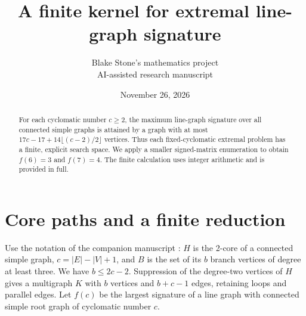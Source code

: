 \documentclass[11pt]{article}
\title{A finite kernel for extremal line-graph signature}
\author{Blake Stone's mathematics project\\\small AI-assisted research manuscript}
\date{November 26, 2026}
\begin{document}
\maketitle
\begin{abstract}
For each cyclomatic number $c\ge2$, the maximum line-graph signature over all connected simple graphs is attained by a graph with at most $17c-17+14\lfloor(c-2)/2\rfloor$ vertices. Thus each fixed-cyclomatic extremal problem has a finite, explicit search space. We apply a smaller signed-matrix enumeration to obtain $f(6)=3$ and $f(7)=4$. The finite calculation uses integer arithmetic and is provided in full.
\end{abstract}

\section{Core paths and a finite reduction}
Use the notation of the companion manuscript \cite{first}: $H$ is the 2-core of a connected simple graph, $c=|E|-|V|+1$, and $B$ is the set of its $b$ branch vertices of degree at least three. We have $b\le2c-2$. Suppression of the degree-two vertices of $H$ gives a multigraph $K$ with $b$ vertices and $b+c-1$ edges, retaining loops and parallel edges. Let $f(c)$ be the largest signature of a line graph with connected simple root graph of cyclomatic number $c$.
\end{document}
